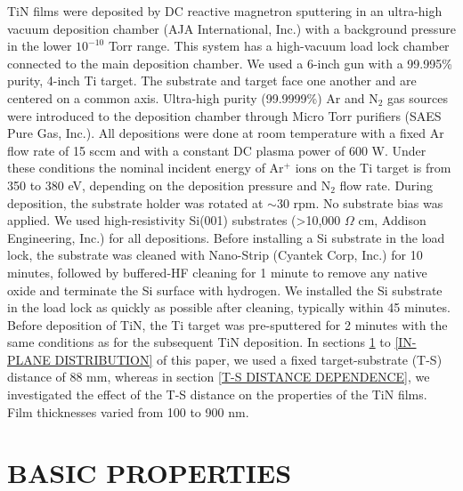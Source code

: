 TiN films were deposited by DC reactive magnetron sputtering in an ultra-high vacuum deposition chamber (AJA International, Inc.) with a background pressure in the lower  $10^{-10}$ Torr range. This system has a high-vacuum load lock chamber connected to the main deposition chamber. We used a 6-inch gun with a 99.995\% purity, 4-inch Ti target. The substrate and target face one another and are centered on a common axis. Ultra-high purity (99.9999\%) Ar and N$_{2}$ gas sources were introduced to the deposition chamber through Micro Torr purifiers (SAES Pure Gas, Inc.). All depositions were done at room temperature with a fixed Ar flow rate of 15 sccm and with a constant DC plasma power of 600 W.  Under these conditions the nominal incident energy of Ar$^{+}$ ions on the Ti target is from 350 to 380 eV, depending on the deposition pressure and N$_{2}$ flow rate.  During deposition, the substrate holder was rotated at $\sim$30 rpm. No substrate bias was applied. We used high-resistivity Si(001) substrates (>10,000 $\Omega$ cm, Addison Engineering, Inc.) for all depositions. Before installing a Si substrate in the load lock, the substrate was cleaned with Nano-Strip (Cyantek Corp, Inc.) for 10 minutes, followed by buffered-HF cleaning for 1 minute to remove any native oxide and terminate the Si surface with hydrogen. We installed the Si substrate in the load lock as quickly as possible after cleaning, typically within 45 minutes. Before deposition of TiN, the Ti target was pre-sputtered for 2 minutes with the same conditions as for the subsequent TiN deposition. In sections \ref{BASIC PROPERTIES} to \ref{IN-PLANE DISTRIBUTION} of this paper, we used a fixed target-substrate (T-S) distance of 88 mm, whereas in section \ref{T-S DISTANCE DEPENDENCE}, we investigated the effect of the T-S distance on the properties of the TiN films.  Film thicknesses varied from 100 to 900 nm.

\section{BASIC PROPERTIES}
\label{BASIC PROPERTIES}

